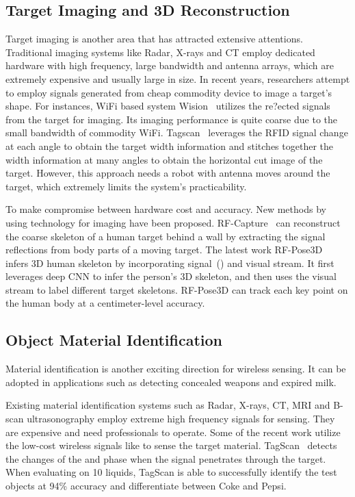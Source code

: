 \subsection{Target Imaging and 3D Reconstruction}

Target imaging is another area that has attracted extensive attentions. Traditional imaging systems like Radar, X-rays and CT employ dedicated
hardware with high frequency, large bandwidth and antenna arrays, which are extremely expensive and usually large in size. In recent years, researchers attempt to employ \RF signals generated from cheap commodity device to image a target's shape. For instances, WiFi based system Wision~\cite{Huang2014Feasibility} utilizes the re?ected signals from the target for imaging. Its imaging performance is quite coarse due to the small bandwidth of commodity WiFi. Tagscan~\cite{Tagscan} leverages the RFID signal change at each angle to obtain the target width information and stitches together the width information at many angles to obtain the horizontal cut image of the target. However, this approach needs a robot with antenna moves around the target, which extremely limits the system's practicability. 

To make compromise between hardware cost and accuracy. New methods by using \FMCW technology for imaging have been proposed. RF-Capture~\cite{Adib2017Capturing} can reconstruct the coarse skeleton of a human target behind a wall by extracting the signal reflections from body parts of a moving target. The latest work RF-Pose3D~\cite{zhao2018rf} infers 3D human skeleton by incorporating \RF signal~(\FMCW) and visual stream. It first leverages deep CNN to infer
the person's 3D skeleton, and then uses the visual stream to label different target skeletons. RF-Pose3D can track each key point
on the human body at a centimeter-level accuracy.


\subsection{Object Material Identification}
Material identification is another exciting direction for wireless sensing. It can be adopted in
applications such as detecting concealed weapons and expired milk. %

Existing material identification systems such as Radar, X-rays, CT, MRI and B-scan ultrasonography employ extreme high
frequency signals for sensing. They are expensive and need professionals to operate. Some of the recent work utilize the low-cost
wireless signals like \RFID to sense the target material. TagScan~\cite{Tagscan} detects the changes of the
\RSSI and phase when the \RF signal penetrates through the target. When evaluating on 10 liquids, TagScan is able to successfully identify
the test objects at 94\% accuracy and differentiate between Coke and Pepsi.%



